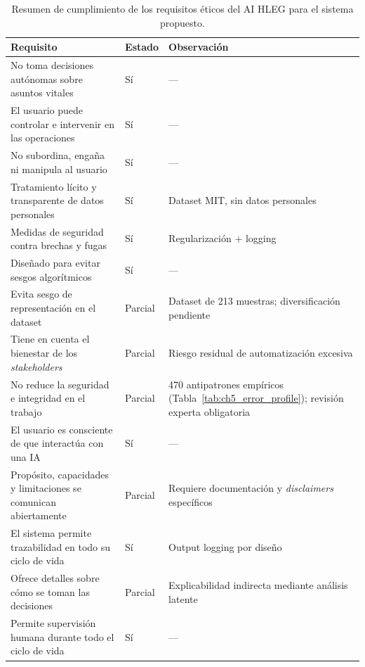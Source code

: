 \begin{table}[htbp]
\centering
\caption{Resumen de cumplimiento de los requisitos éticos del AI HLEG para el sistema
         propuesto.}
\label{tab:ch8_checklist}
\begin{tabular}{p{}p{}p{}}
\toprule
\textbf{Requisito} & \textbf{Estado} & \textbf{Observación} \\
\midrule
No toma decisiones autónomas sobre asuntos vitales                   & Sí      & --- \\
El usuario puede controlar e intervenir en las operaciones           & Sí      & --- \\
No subordina, engaña ni manipula al usuario                          & Sí      & --- \\
Tratamiento lícito y transparente de datos personales                & Sí      & Dataset MIT, sin datos personales \\
Medidas de seguridad contra brechas y fugas                          & Sí      & Regularización + logging \\
Diseñado para evitar sesgos algorítmicos                             & Sí      & --- \\
Evita sesgo de representación en el dataset                          & Parcial & Dataset de 213 muestras; diversificación pendiente \\
Tiene en cuenta el bienestar de los \textit{stakeholders}            & Parcial & Riesgo residual de automatización excesiva \\
No reduce la seguridad e integridad en el trabajo                    & Parcial & 470 antipatrones empíricos (Tabla~\ref{tab:ch5_error_profile}); revisión experta obligatoria \\
El usuario es consciente de que interactúa con una IA                & Sí      & --- \\
Propósito, capacidades y limitaciones se comunican abiertamente      & Parcial & Requiere documentación y \textit{disclaimers} específicos \\
El sistema permite trazabilidad en todo su ciclo de vida             & Sí      & Output logging por diseño \\
Ofrece detalles sobre cómo se toman las decisiones                   & Parcial & Explicabilidad indirecta mediante análisis latente \\
Permite supervisión humana durante todo el ciclo de vida             & Sí      & --- \\
\bottomrule
\end{tabular}
\end{table}

